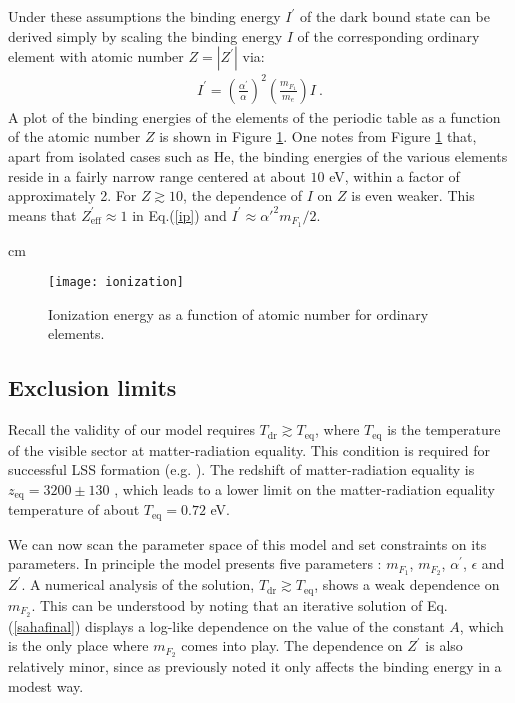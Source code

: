 \documentclass[12pt]{article}
\begin{document}
Under these assumptions the binding energy $I ^{'}$ of the dark bound
state can be derived simply by scaling the binding energy $I$ of the
corresponding ordinary element with atomic number $Z = |Z ^{'}|$ via:
%
\begin{eqnarray}
I ^{'} = \left ( \frac{\alpha ^{'}}{\alpha} \right ) ^2 \left ( \frac{m
_{F_1}}{m _e} \right ) I \ .
\label{scaling}
\end{eqnarray}
%
A plot of the binding energies of the elements of the periodic table as
a function of the atomic number $Z$ is shown in Figure
\ref{fig:Ionization}. One notes from Figure \ref{fig:Ionization} that,
apart from isolated cases such as He, the binding energies of the
various elements reside in a fairly narrow range centered at about $10$
eV, within a factor of approximately 2. For $Z \gtrsim 10$, the
dependence of $I$ on $Z$ is even weaker. This means that $Z
_{\text{eff}} ^{'} \approx 1$ in Eq.(\ref{ip}) and $I ^{'} \approx
{\alpha '} ^2m _{F_1}/2$.

 cm

%
\begin{figure}[htpb]
    \centering
        \texttt{[image: ionization]}
    \caption{Ionization energy as a function of atomic number for
ordinary elements.}
    \label{fig:Ionization}
\end{figure}
%
\newpage

\subsection{Exclusion limits}
\vskip 0.3cm

Recall the validity of our model requires $T _{\text{dr}} \gtrsim T
_{\text{eq}}$, where $T _{\text{eq}}$ is the temperature of the visible
sector at matter-radiation equality. This condition is required for
successful LSS formation (e.g. \cite{volkaspetraki}). The redshift of
matter-radiation equality is $z _{\text{eq}} = 3200 \pm 130$ \cite{pdg},
which leads to a lower limit on the matter-radiation equality
temperature of about $T _{\text{eq}} = 0.72$ eV.

We can now scan the parameter space of this model and set constraints on
its parameters. In principle the model presents five parameters : $m
_{F_1}$, $m
_{F_2}$, $\alpha ^{'}$, $\epsilon$ and $Z ^{'}$. A numerical analysis of
the solution, $T _{\text{dr}} \gtrsim T _{\text{eq}}$, 
shows a weak dependence on $m _{F_2}$. This can be understood by noting
that an iterative solution of Eq.(\ref{sahafinal}) displays a log-like
dependence on the value of the constant $A$, which is the only place
where $m _{F_2}$ comes into play. The dependence on $Z ^{'}$ is also
relatively minor, since as previously noted it only affects the binding
energy in a modest way.
\end{document}
